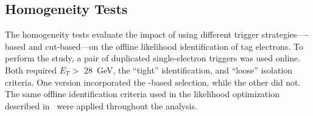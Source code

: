 \FloatBarrier
\subsection[Homogeneity Tests]{Homogeneity Tests}\label{ssec:agreement}


The homogeneity tests evaluate the impact of using different trigger strategies—\rnn{}-based and cut-based—on the offline likelihood identification of tag electrons. To perform the study, a pair of duplicated single-electron triggers was used online. Both required $E_T >$ \SI{28}{\GeV}, the \enquote{tight} identification, and \enquote{loose} isolation criteria. One version incorporated the \rnn{}-based selection, while the other did not. The same offline identification criteria used in the likelihood optimization described in~\cite{PERF-2017-01} were applied throughout the analysis.





